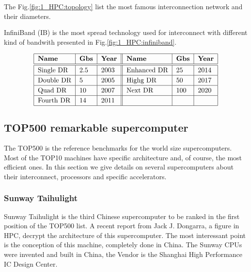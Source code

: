 The Fig.\ref{fig:1_HPC:topology} list the most famous interconnection network and their diameters.

InfiniBand (IB) is the most spread technology used for interconnect with different kind of bandwith presented in Fig.\ref{fig:1_HPC:infiniband}.

\begin{table}
\begin{center}
\[\arraycolsep=0.pt\def\arraystretch{1.2}
\begin{tabular}{| l | l | l || l | l | l | }
\hline
\textbf{Name} & \textbf{Gbs} & \textbf{Year} & \textbf{Name} & \textbf{Gbs} & \textbf{Year} \\
\hline
\hline
Single DR & 2.5 & 2003 & Enhanced DR & 25 & 2014 \\
\hline
Double DR & 5 & 2005 & Highg DR & 50 & 2017 \\
\hline
Quad DR & 10 & 2007 & Next DR & 100 & 2020 \\
\hline
Fourth DR & 14 & 2011 & & &  \\
\hline
\end{tabular}
\]
\caption{InfiniBand technologies}
\label{fig:1_HPC:infiniband}
\end{center}
\end{table}

\subsection{TOP500 remarkable supercomputer}
The TOP500 is the reference benchmarks for the world size supercomputers. 
Most of the TOP10 machines have specific architecture and, of course, the most efficient ones. 
In this section we give details on several supercomputers about their interconnect, processors and specific accelerators. 

\subsubsection{Sunway Taihulight}

Sunway Taihulight is the third Chinese supercomputer to be ranked in the first position of the TOP500 list. 
A recent report from Jack J. Dongarra, a figure in HPC, decrypt the architecture of this supercomputer\cite{dongarra2016report}. 
The most interessant point is the conception of this machine, completely done in China. 
The Sunway CPUs were invented and built in China, the Vendor is the Shanghai High Performance IC Design Center. 

